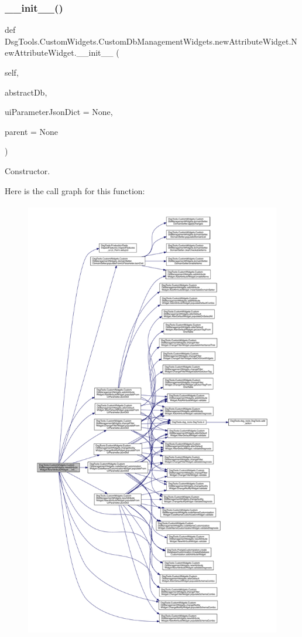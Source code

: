 \subsubsection{\texorpdfstring{\+\_\+\+\_\+init\+\_\+\+\_\+()}{\_\_init\_\_()}}
{\footnotesize\ttfamily def Dsg\+Tools.\+Custom\+Widgets.\+Custom\+Db\+Management\+Widgets.\+new\+Attribute\+Widget.\+New\+Attribute\+Widget.\+\_\+\+\_\+init\+\_\+\+\_\+ (\begin{DoxyParamCaption}\item[{}]{self,  }\item[{}]{abstract\+Db,  }\item[{}]{ui\+Parameter\+Json\+Dict = {\ttfamily None},  }\item[{}]{parent = {\ttfamily None} }\end{DoxyParamCaption})}

\begin{DoxyVerb}Constructor.\end{DoxyVerb}
 Here is the call graph for this function\+:
\nopagebreak
\begin{figure}[H]
\begin{center}
\leavevmode
\includegraphics[height=550pt]{class_dsg_tools_1_1_custom_widgets_1_1_custom_db_management_widgets_1_1new_attribute_widget_1_1_new_attribute_widget_abeae33f72fc1c429774df806361868ad_cgraph}
\end{center}
\end{figure}


